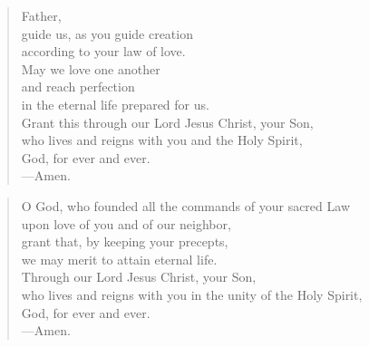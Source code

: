\prayer

\setlength{\leftmargini}{\prayerleftmargini}

\begin{verse}
Father,\\
guide us, as you guide creation\\
according to your law of love.\\
May we love one another\\
and reach perfection\\
in the eternal life prepared for us.\\
Grant this through our Lord Jesus Christ, your Son,\\
who lives and reigns with you and the Holy Spirit,\\
God, for ever and ever.\\
{\color{red}---\thinspace}Amen.
\end{verse}


\begin{verse}
O God, who founded all the commands of your sacred Law\\
upon love of you and of our neighbor,\\
grant that, by keeping your precepts,\\
we may merit to attain eternal life.\\
Through our Lord Jesus Christ, your Son,\\
who lives and reigns with you in the unity of the Holy Spirit,\\
God, for ever and ever.\\
{\color{red}---\thinspace}Amen.
\end{verse}

\setlength{\leftmargini}{\defleftmargini}